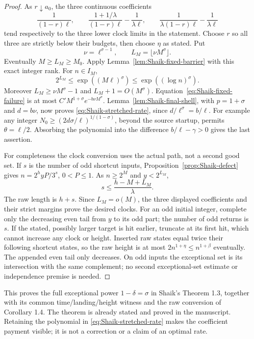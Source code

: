 \begin{proof}
As \(r\downarrow a_0\), the three continuous coefficients
\[
 \frac1{(1-r)\ell},\qquad
 \frac{1+1/\lambda}{(1-r)\ell}-\frac1{\lambda\ell},\qquad
 \frac1{\lambda(1-r)\ell}-\frac1{\lambda\ell}
\]
tend respectively to the three lower clock limits in the statement.
Choose \(r\) so all three are strictly below their budgets, then
choose \(\eta\) as stated. Put
\[
 \nu=\ell^{\sigma-1},\qquad L_M=\lfloor\nu M^\sigma\rfloor.
\]
Eventually \(M\ge L_M\ge M_0\). Apply
Lemma~\ref{lem:Shaik-fixed-barrier} with this exact integer rank.
For \(n\in I_M\),
\[
 2^{L_M}\le\exp((M\ell)^\sigma)\le\exp((\log n)^\sigma).
\]
Moreover \(L_M\ge\nu M^\sigma-1\) and \(L_M+1=O(M^\sigma)\).
Equation~\eqref{eq:Shaik-fixed-failure} is at most
\(C'M^{1+\sigma}e^{-b\nu M^\sigma}\).
Lemma~\ref{lem:Shaik-final-shell}, with
\(p=1+\sigma\) and \(d=b\nu\), now proves
\eqref{eq:Shaik-stretched-rate}, since \(d/\ell^\sigma=b/\ell\).
For example any integer
\(N_0\ge(2d\sigma/\ell)^{1/(1-\sigma)}\), beyond the source startup,
permits \(\theta=\ell/2\).
Absorbing the polynomial into the difference \(b/\ell-\gamma>0\)
gives the last assertion.

For completeness the clock conversion uses the actual path, not a
second good set. If \(s\) is the number of odd shortcut inputs,
Proposition~\ref{prop:Shaik-defect} gives
\(n=2^hyP/3^s\), \(0<P\le1\).
As \(n\ge2^M\) and \(y<2^{L_M}\),
\begin{equation}\label{eq:Shaik-fixed-odd-budget}
 s\le\frac{h-M+L_M}{\lambda}.
\end{equation}
The raw length is \(h+s\). Since \(L_M=o(M)\), the three displayed
coefficients and their strict margins prove the desired clocks.
For an odd initial integer, complete only the decreasing even tail
from \(y\) to its odd part; the number of odd returns is \(s\).
If the stated, possibly larger target is hit earlier, truncate at its
first hit, which cannot increase any clock or height.
Inserted raw states equal twice their following shortcut states, so
the raw height is at most \(2n^{1+\eta}\le n^{1+\beta}\) eventually.
The appended even tail only decreases.
On odd inputs the exceptional set is its intersection with the same
complement; no second exceptional-set estimate or independence premise
is needed.
\end{proof}

This proves the full exceptional power \(1-\delta=\sigma\) in
Shaik's Theorem 1.3, together with its common time/landing/height witness
and the raw conversion of Corollary 1.4. The theorem is already stated
and proved in the manuscript. Retaining the polynomial in
\eqref{eq:Shaik-stretched-rate} makes the coefficient payment visible;
it is not a correction or a claim of an optimal rate.

